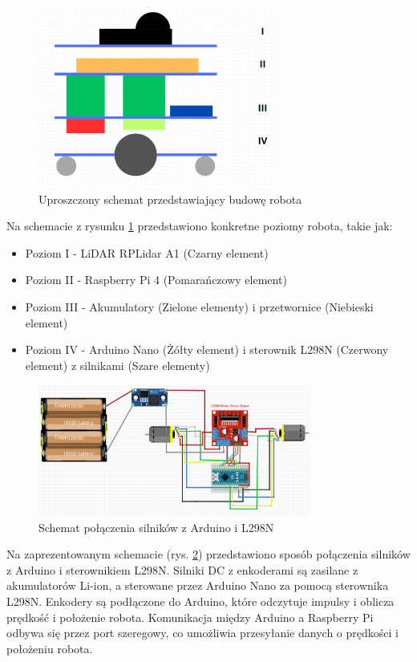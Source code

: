 \documentclass[a4paper,twoside,12pt]{book}
\begin{document}
	\begin{figure}[!hb]
		\centering
		\includegraphics[width=0.7\textwidth]{images/schemat-robot.png}
		\caption{Uproszczony schemat przedstawiający budowę robota}
		\label{fig:robot-schemat}
		\end{figure}
Na schemacie z rysunku \ref{fig:robot-schemat} przedstawiono konkretne poziomy robota, takie jak:
\begin{itemize}
	\item Poziom I - LiDAR RPLidar A1 (Czarny element)
	\item Poziom II - Raspberry Pi 4 (Pomarańczowy element)
	\item Poziom III - Akumulatory (Zielone elementy) i przetwornice (Niebieski element)
	\item Poziom IV - Arduino Nano (Żółty element) i sterownik L298N (Czerwony element) z silnikami (Szare elementy)
\end{itemize}
\newpage

\begin{figure}[!hb]
	\centering
	\includegraphics[width=0.8\textwidth]{images/schema_arduino.png}
	\caption{Schemat połączenia silników z Arduino i L298N}
	\label{fig:arduino-schema}
	\end{figure}
Na zaprezentowanym schemacie (rys. \ref{fig:arduino-schema}) przedstawiono sposób połączenia silników z Arduino i sterownikiem L298N. Silniki DC z enkoderami są zasilane z akumulatorów Li-ion, a sterowane przez Arduino Nano za pomocą sterownika L298N. Enkodery są podłączone do Arduino, które odczytuje impulsy i oblicza prędkość i położenie robota. Komunikacja między Arduino a Raspberry Pi odbywa się przez port szeregowy, co umożliwia przesyłanie danych o prędkości i położeniu robota.
\newpage
\newpage
\end{document}
